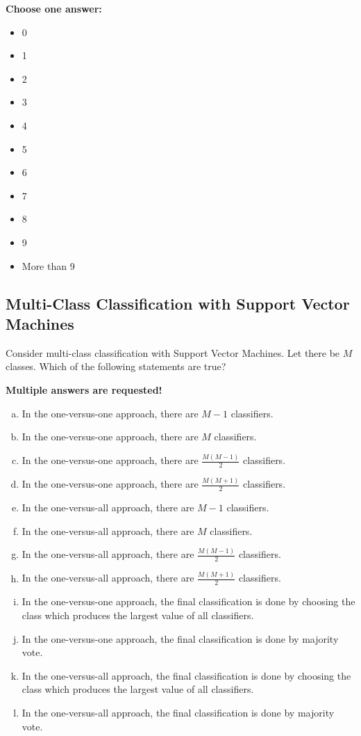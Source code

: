 \documentclass{article}
\begin{document}
\textbf{Choose one answer:}

\begin{itemize}
    \item[(a)] 0
    \item[(b)] 1
    \item[(c)] 2
    \item[(d)] 3
    \item[(e)] 4
    \item[(f)] 5
    \item[(g)] 6
    \item[(h)] 7
    \item[(i)] 8
    \item[(j)] 9
    \item[(k)] More than 9
\end{itemize}

\subsection*{Multi-Class Classification with Support Vector Machines}

Consider multi-class classification with Support Vector Machines. Let there be \(M\) classes. Which of the following statements are true?

\textbf{Multiple answers are requested!}

\begin{enumerate}[(a)]
    \item In the one-versus-one approach, there are \(M - 1\) classifiers.
    \item In the one-versus-one approach, there are \(M\) classifiers.
    \item In the one-versus-one approach, there are \(\frac{M(M-1)}{2}\) classifiers.
    \item In the one-versus-one approach, there are \(\frac{M(M+1)}{2}\) classifiers.
    \item In the one-versus-all approach, there are \(M - 1\) classifiers.
    \item In the one-versus-all approach, there are \(M\) classifiers.
    \item In the one-versus-all approach, there are \(\frac{M(M-1)}{2}\) classifiers.
    \item In the one-versus-all approach, there are \(\frac{M(M+1)}{2}\) classifiers.
    \item In the one-versus-one approach, the final classification is done by choosing the class which produces the largest value of all classifiers.
    \item In the one-versus-one approach, the final classification is done by majority vote.
    \item In the one-versus-all approach, the final classification is done by choosing the class which produces the largest value of all classifiers.
    \item In the one-versus-all approach, the final classification is done by majority vote.
\end{enumerate}
\end{document}
